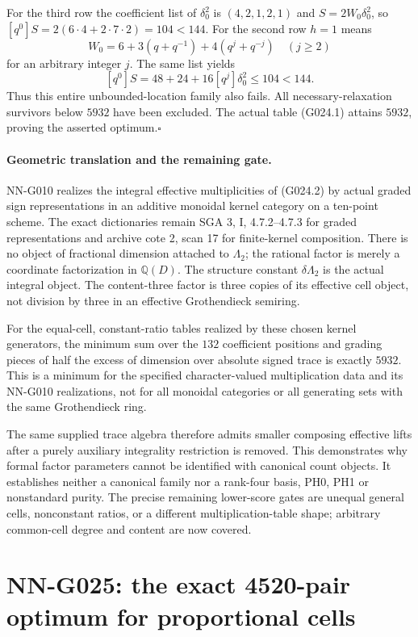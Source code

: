 For the third row the coefficient list of $\delta_0^2$
is $(4,2,1,2,1)$ and $S=2W_0\delta_0^2$, so
$[q^0]S=2(6\cdot4+2\cdot7\cdot2)=104<144$.
For the second row $h=1$ means
\[
 W_0=6+3(q+q^{-1})+4(q^j+q^{-j})\quad(j\ge2)
\]
for an arbitrary integer $j$. The same list yields
\[
 [q^0]S=48+24+16[q^j]\delta_0^2\le104<144.
\]
Thus this entire unbounded-location family also fails.
All necessary-relaxation survivors below $5932$ have
been excluded. The actual table (G024.1) attains $5932$,
proving the asserted optimum.\hfill$\square$

\paragraph{Geometric translation and the remaining gate.}
NN-G010 realizes the integral effective multiplicities of
(G024.2) by actual graded sign representations in an
additive monoidal kernel category on a ten-point scheme.
The exact dictionaries remain SGA 3, I, 4.7.2--4.7.3
for graded representations and archive cote 2, scan 17
for finite-kernel composition. There is no object of
fractional dimension attached to $\Lambda_2$; the rational
factor is merely a coordinate factorization in $\mathbb Q(D)$.
The structure constant $\delta\Lambda_2$ is the actual
integral object. The content-three factor is three copies
of its effective cell object, not division by three in
an effective Grothendieck semiring.

For the equal-cell, constant-ratio tables realized by these
chosen kernel generators, the minimum sum over the $132$
coefficient positions and grading pieces of half the excess of dimension over
absolute signed trace is exactly $5932$. This is a minimum
for the specified character-valued multiplication data and
its NN-G010 realizations, not for all monoidal categories
or all generating sets with the same Grothendieck ring.

The same supplied trace algebra therefore admits smaller
composing effective lifts after a purely auxiliary
integrality restriction is removed. This demonstrates
why formal factor parameters cannot be identified with
canonical count objects. It establishes neither a
canonical family nor a rank-four basis, PH0, PH1 or
nonstandard purity. The precise remaining lower-score
gates are unequal general cells, nonconstant ratios,
or a different multiplication-table shape; arbitrary
common-cell degree and content are now covered.



\section{NN-G025: the exact 4520-pair optimum for proportional cells}
